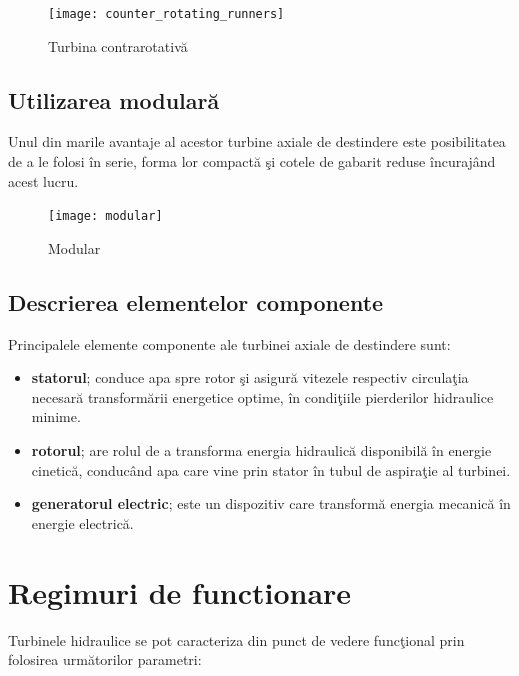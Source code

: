 \begin{figure}[h!]
	\centering
	\texttt{[image: counter\_rotating\_runners]}
	\caption{Turbina contrarotativ\u{a} \cite{andolfatto2016simulation}}
	\label{Turbina contrarotativ\u{a}}
\end{figure}

\clearpage


\subsection{Utilizarea modular\u{a}}
Unul din marile avantaje al acestor turbine axiale de destindere este posibilitatea de a le folosi \^{i}n serie, forma lor compact\u{a} \c{s}i cotele de gabarit reduse \^{i}ncuraj\^{a}nd acest lucru.

\begin{figure}[h!]
	\centering
	\texttt{[image: modular]}
	\caption{Modular \cite{hasmatuchi2014new}}
	\label{Modular}
\end{figure}

\subsection{Descrierea elementelor componente}

Principalele elemente componente ale turbinei axiale de destindere sunt:

\begin{itemize}
	\item \textbf{statorul}; conduce apa spre rotor \c{s}i asigur\u{a} vitezele respectiv circula\c{t}ia necesar\u{a} transform\u{a}rii energetice optime, \^{i}n condi\c{t}iile pierderilor hidraulice minime.
	\item \textbf{rotorul}; are rolul de a transforma energia hidraulic\u{a} disponibil\u{a} \^{i}n energie cinetic\u{a}, conduc\^{a}nd apa care vine prin stator \^{i}n tubul de aspira\c{t}ie al turbinei.
	\item \textbf{generatorul electric}; este un dispozitiv care transform\u{a} energia mecanic\u{a} \^{i}n energie electric\u{a}.
\end{itemize}


\section{Regimuri de functionare}

Turbinele hidraulice se pot caracteriza din punct de vedere func\c{t}ional prin folosirea urm\u{a}torilor parametri:

